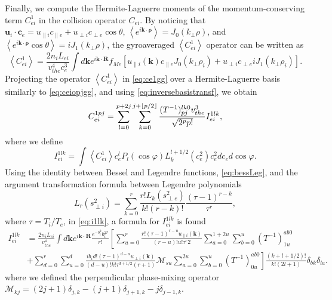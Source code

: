 Finally, we compute the Hermite-Laguerre moments of the momentum-conserving term $C_{ei}^1$ in the collision operator $C_{ei}$.
%
By noticing that $\mathbf u_i \cdot \mathbf c_e=u_{\parallel i} c_{\parallel e}+u_{\perp i} c_{\perp e} \cos \theta$, $\left<e^{i \mathbf k \cdot \mathbf \rho }\right>=J_0(k_\perp \rho)$, and $\left<e^{i \mathbf k \cdot \mathbf \rho }\cos \theta \right>=i J_1(k_\perp \rho)$, the gyroaveraged $\left< C_{ei}^{1}\right>$ operator can be written as
%
\begin{equation}
    \left< C_{ei}^{1}\right> = \frac{2 n_i L_{ei}}{v_{the}^4c_e^3}\int d\mathbf k e^{i \mathbf k \cdot \mathbf R}f_{Me}\left[ u_{\parallel i}(\mathbf k) c_{\parallel e} J_0(k_\perp \rho_i)+u_{\perp i} c_{\perp e} i J_1(k_\perp \rho_i)\right].
\label{eq:ce1gg}
\end{equation}
%
Projecting the operator $\left< C_{ei}^{1}\right>$ in \cref{eq:ce1gg} over a Hermite-Laguerre basis similarly to \cref{eq:ceiopjgg}, and using \cref{eq:inversebasistransf}, we obtain
%
\begin{equation}
    C_{ei}^{1pj}=\sum_{l=0}^{p+2j}\sum_{k=0}^{j+\lfloor p/2\rfloor}\frac{(T^{-1})_{pj}^{lk0}v_{the}^3}{\sqrt{2^p p!}} I_{ei}^{1lk},
\end{equation}
%
where we define
%
\begin{equation}
    I_{ei}^{1lk}=\int \left<C_{ei}^1\right> c_e^l P_l(\cos \varphi) L_k^{l+1/2}(c_e^2) c_e^2 dc_e d\cos \varphi.
\label{eq:i1lk}
\end{equation}
%
Using the identity between Bessel and Legendre functions, \cref{eq:bessLeg}, and the argument transformation formula between Legendre polynomials
%
\begin{equation}
    L_r(s_{\perp i}^2) = \sum_{k=0}^r \frac{r! L_k(s_{\perp e}^2)}{k!(r-k)!}\frac{(\tau-1)^{r-k}}{\tau^r},
\end{equation}
%
where $\tau=T_i/T_e$, in \cref{eq:i1lk}, a formula for $I_{ei}^{1lk}$ is found
%
\begin{align}
    I_{ei}^{1lk}&=\frac{2 n_i L_{ei}}{v_{the}^4}\int d \mathbf k e^{i \mathbf k \cdot \mathbf R} \frac{e^{-b_i^2}b_i^{2r}}{r!}\left[\sum_{u=0}^r\frac{r!(\tau-1)^{r-u}u_{\parallel i}(\mathbf k)}{(r-u)!u!\tau^r2}\sum_{a=0}^{1+2u}\sum_{b=0}^{u}\left(T^{-1}\right)^{ab0}_{1u}\right.\nonumber\\
    &\left.+\sum_{d=0}^r \sum_{u=0}^d \frac{i b_i d! (\tau-1)^{d-u}u_{\perp i}(\mathbf k)}{(d-u)!k! \tau^{d+1/2}(r+1)}\mathcal{M}_{su}\sum_{a=0}^{2u}\sum_{b=0}^{u}\left(T^{-1}\right)^{ab0}_{0u}\right]\frac{(k+l+1/2)!}{k!(2l+1)}\delta_{bk}\delta_{la}.
\end{align}
%
where we defined the perpendicular phase-mixing operator $\mathcal{M}_{kj}=(2j+1)\delta_{j,k}-(j+1)\delta_{j+1, k}-j\delta_{j-1 ,k}$.

